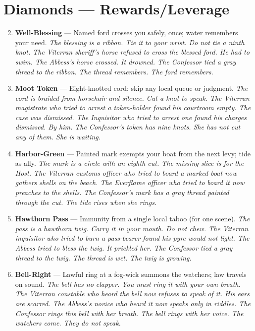 \section*{Diamonds --- Rewards/Leverage}
\label{sec:theona-rewards}
\begin{enumerate}
\setcounter{enumi}{1}
\item \textbf{Well-Blessing} --- Named ford crosses you safely, once; water remembers your need.
  \hfill \textit{The blessing is a ribbon. Tie it to your wrist. Do not tie a ninth knot. The Viterran sheriff's horse refused to cross the blessed ford. He had to swim. The Abbess's horse crossed. It drowned. The Confessor tied a gray thread to the ribbon. The thread remembers. The ford remembers.}
\item \textbf{Moot Token} --- Eight-knotted cord; skip any local queue or judgment.
  \hfill \textit{The cord is braided from horsehair and silence. Cut a knot to speak. The Viterran magistrate who tried to arrest a token-holder found his courtroom empty. The case was dismissed. The Inquisitor who tried to arrest one found his charges dismissed. By him. The Confessor's token has nine knots. She has not cut any of them. She is waiting.}
\item \textbf{Harbor-Green} --- Painted mark exempts your boat from the next levy; tide as ally.
  \hfill \textit{The mark is a circle with an eighth cut. The missing slice is for the Host. The Viterran customs officer who tried to board a marked boat now gathers shells on the beach. The Everflame officer who tried to board it now preaches to the shells. The Confessor's mark has a gray thread painted through the cut. The tide rises when she rings.}
\item \textbf{Hawthorn Pass} --- Immunity from a single local taboo (for one scene).
  \hfill \textit{The pass is a hawthorn twig. Carry it in your mouth. Do not chew. The Viterran inquisitor who tried to burn a pass-bearer found his pyre would not light. The Abbess tried to bless the twig. It prickled her. The Confessor tied a gray thread to the twig. The thread is wet. The twig is growing.}
\item \textbf{Bell-Right} --- Lawful ring at a fog-wick summons the watchers; law travels on sound.
  \hfill \textit{The bell has no clapper. You must ring it with your own breath. The Viterran constable who heard the bell now refuses to speak of it. His ears are scarred. The Abbess's novice who heard it now speaks only in riddles. The Confessor rings this bell with her breath. The bell rings with her voice. The watchers come. They do not speak.}

\end{enumerate}
